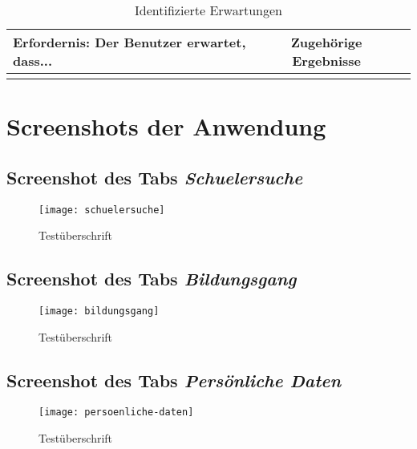 \begin{landscape}
\begin{longtable}{p{15cm}cc}
    \caption{Identifizierte Erwartungen} \label{tab:mytable} \\
    \toprule
    Erfordernis: Der Benutzer erwartet, dass... & Zugehörige Ergebnisse \\
    \midrule
    \bottomrule
    \endfoot
    \label{tab:erwartungen}
\end{longtable}


\section{Screenshots der Anwendung}
    \subsection{Screenshot des Tabs \textit{Schuelersuche}}
    \label{section-schuelersuche}
    \begin{figure}[H]
        \centering
        \caption{Testüberschrift}
        \begin{adjustbox}{width=\linewidth, center}
            \texttt{[image: schuelersuche]}
        \end{adjustbox}
    \end{figure}

    \subsection{Screenshot des Tabs \textit{Bildungsgang}}
    \label{section-bildungsgang}
    \begin{figure}[H]
        \centering
        \caption{Testüberschrift}
        \begin{adjustbox}{width=\linewidth, center}
            \texttt{[image: bildungsgang]}
        \end{adjustbox}
    \end{figure}

    \subsection{Screenshot des Tabs \textit{Persönliche Daten}}
    \label{section-persoenliche-daten}
    \begin{figure}[H]
        \centering
        \caption{Testüberschrift}
        \begin{adjustbox}{width=\linewidth, center}
            \texttt{[image: persoenliche-daten]}
        \end{adjustbox}
    \end{figure}


\end{landscape}

